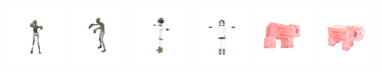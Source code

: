 \begin{figure}[htbp]
  \includegraphics[width=0.15\textwidth]{images/data/samples/16.1.jpeg}\hspace{0.01\textwidth}%
  \includegraphics[width=0.15\textwidth]{images/data/samples/16.2.jpeg}\hfill
  \includegraphics[width=0.15\textwidth]{images/data/samples/25.1.jpeg}\hspace{0.01\textwidth}%
  \includegraphics[width=0.15\textwidth]{images/data/samples/25.2.jpeg}\hfill
  \includegraphics[width=0.15\textwidth]{images/data/samples/18.1.jpeg}\hspace{0.01\textwidth}%
  \includegraphics[width=0.15\textwidth]{images/data/samples/18.2.jpeg} \\
  \vspace{2mm}


\end{figure}
